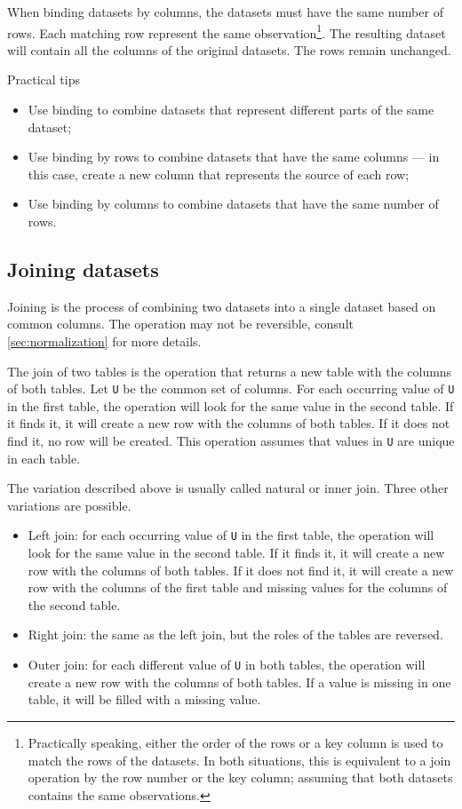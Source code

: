 When binding datasets by columns, the datasets must have the same number of rows.  Each
matching row represent the same observation\footnote{Practically speaking, either the
order of the rows or a key column is used to match the rows of the datasets.  In both
situations, this is equivalent to a join operation by the row number or the key column;
assuming that both datasets contains the same observations.}. The resulting dataset will
contain all the columns of the original datasets.  The rows remain unchanged.

\begin{mainbox}{Practical tips}
  \begin{itemize}
    \item Use binding to combine datasets that represent different parts of the same dataset;
    \item Use binding by rows to combine datasets that have the same columns --- in this
      case, create a new column that represents the source of each row;
    \item Use binding by columns to combine datasets that have the same number of rows.
  \end{itemize}
\end{mainbox}

\subsection{Joining datasets}

Joining is the process of combining two datasets into a single dataset based on common
columns.  The operation may not be reversible, consult \cref{sec:normalization} for more
details.

The join of two tables is the operation that returns a new table with the columns of both
tables.  Let \texttt{U} be the common set of columns.  For each occurring value of
\texttt{U} in the first table, the operation will look for the same value in the second
table.  If it finds it, it will create a new row with the columns of both tables.  If it
does not find it, no row will be created.  This operation assumes that values in \texttt{U}
are unique in each table.

The variation described above is usually called natural or inner join.  Three other
variations are possible.
\begin{itemize}
  \item Left join: for each occurring value of \texttt{U} in the first table, the operation
    will look for the same value in the second table.  If it finds it, it will create a new
    row with the columns of both tables.  If it does not find it, it will create a new row
    with the columns of the first table and missing values for the columns of the second
    table.
  \item Right join: the same as the left join, but the roles of the tables are reversed.
  \item Outer join: for each different value of \texttt{U} in both tables, the operation
    will create a new row with the columns of both tables.  If a value is missing in one
    table, it will be filled with a missing value.
\end{itemize}

